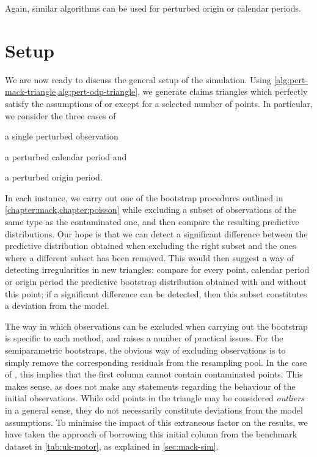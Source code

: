 \documentclass[a4paper]{book}
\begin{document}
Again, similar algorithms can be used for perturbed origin or calendar periods.

\section{Setup}

We are now ready to discuss the general setup of the simulation. Using \cref{alg:pert-mack-triangle,alg:pert-odp-triangle}, we generate claims triangles which perfectly satisfy the assumptions of  or  except for a selected number of points. In particular, we consider the three cases of
\begin{inparaenum}[(i)]
  \item a single perturbed observation
  \item a perturbed calendar period and
  \item a perturbed origin period.
\end{inparaenum}
In each instance, we carry out one of the bootstrap procedures outlined in \cref{chapter:mack,chapter:poisson} while excluding a subset of observations of the same type as the contaminated one, and then compare the resulting predictive distributions. Our hope is that we can detect a significant difference between the predictive distribution obtained when excluding the right subset and the ones where a different subset has been removed. This would then suggest a way of detecting irregularities in new triangles: compare for every point, calendar period or origin period the predictive bootstrap distribution obtained with and without this point; if a significant difference can be detected, then this subset constitutes a deviation from the model.

The way in which observations can be excluded when carrying out the bootstrap is specific to each method, and raises a number of practical issues. For the semiparametric bootstraps, the obvious way of excluding observations is to simply remove the corresponding residuals from the resampling pool. In the case of , this implies that the first column cannot contain contaminated points. This makes sense, as  does not make any statements regarding the behaviour of the initial observations. While odd points in the triangle may be considered \emph{outliers} in a general sense, they do not necessarily constitute deviations from the model assumptions. To minimise the impact of this extraneous factor on the results, we have taken the approach of borrowing this initial column from the benchmark dataset in \cref{tab:uk-motor}, as explained in \cref{sec:mack-sim}.
\end{document}

